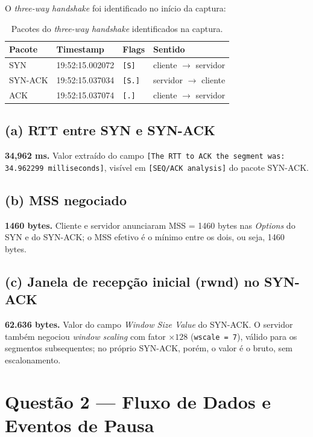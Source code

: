 \documentclass[12pt,a4paper]{article}
\begin{document}
O \textit{three-way handshake} foi identificado no início da captura:

\begin{table}[H]
\centering
\begin{tabular}{@{}llll@{}}
    \toprule
    \textbf{Pacote} & \textbf{Timestamp} & \textbf{Flags} & \textbf{Sentido} \\
    \midrule
    SYN     & 19:52:15.002072 & \texttt{[S]}  & cliente $\to$ servidor \\
    SYN-ACK & 19:52:15.037034 & \texttt{[S.]} & servidor $\to$ cliente \\
    ACK     & 19:52:15.037074 & \texttt{[.]}  & cliente $\to$ servidor \\
    \bottomrule
\end{tabular}
\caption{Pacotes do \textit{three-way handshake} identificados na captura.}
\end{table}

\subsection*{(a) RTT entre SYN e SYN-ACK}
\textbf{34,962 ms.} Valor extraído do campo \texttt{[The RTT to ACK the segment was:
34.962299 milliseconds]}, visível em \texttt{[SEQ/ACK analysis]} do pacote SYN-ACK.

\subsection*{(b) MSS negociado}
\textbf{1460 bytes.} Cliente e servidor anunciaram MSS = 1460 bytes nas \textit{Options}
do SYN e do SYN-ACK; o MSS efetivo é o mínimo entre os dois, ou seja, 1460 bytes.

\subsection*{(c) Janela de recepção inicial (rwnd) no SYN-ACK}
\textbf{62.636 bytes.} Valor do campo \textit{Window Size Value} do SYN-ACK. O servidor
também negociou \textit{window scaling} com fator $\times 128$ (\texttt{wscale = 7}),
válido para os segmentos subsequentes; no próprio SYN-ACK, porém, o valor é o bruto,
sem escalonamento.

\section{Questão 2 — Fluxo de Dados e Eventos de Pausa}
\end{document}
